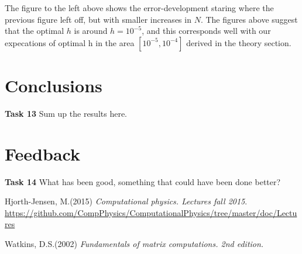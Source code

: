 \documentclass{article}
\begin{document}
The figure to the left above shows the error-development staring where the previous figure left off, but with smaller increases in $N$. The figures above suggest that the optimal $h$ is around $h = 10^{-5}$, and this corresponds well with our expecations of optimal h in the area $[10^{-5}, 10^{-4}]$ derived in the theory section. 

\section{Conclusions}
\textbf{Task 13} Sum up the results here.

\section{Feedback}
\textbf{Task 14} What has been good, something that could have been done better?

\begin{thebibliography}{9}
	Hjorth-Jensen, M.(2015)
	\textit{Computational physics. Lectures fall 2015}. 
	\url{https://github.com/CompPhysics/ComputationalPhysics/tree/master/doc/Lectures}
	
	Watkins, D.S.(2002)
	\textit{Fundamentals of matrix computations. 2nd edition.}

\end{thebibliography}
\end{document}
